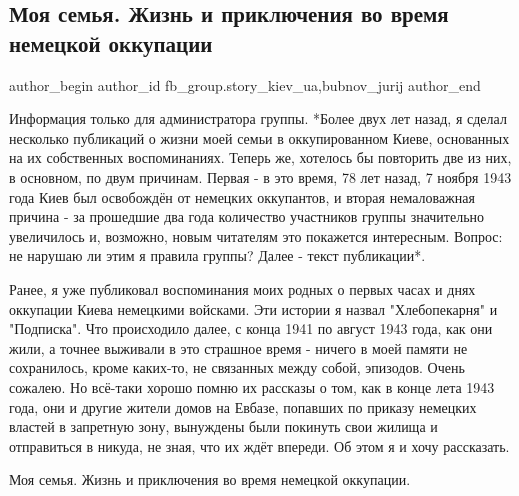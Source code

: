  
 
 
 
 
 
\subsection{Моя семья. Жизнь и приключения во время немецкой оккупации}
\label{sec:04_11_2021.fb.fb_group.story_kiev_ua.1.semja_kiev_okupacia}
 
\ifcmt
 author_begin
   author_id fb_group.story_kiev_ua,bubnov_jurij
 author_end
\fi

Информация только для администратора группы. *Более двух лет назад, я сделал
несколько публикаций о жизни моей семьи в оккупированном Киеве, основанных на
их собственных воспоминаниях. Теперь же, хотелось бы повторить две из них, в
основном, по двум причинам. Первая - в это время, 78 лет назад, 7 ноября 1943
года Киев был освобождён от немецких оккупантов, и вторая немаловажная причина
- за прошедшие два года количество участников группы значительно увеличилось и,
возможно, новым читателям это покажется интересным. Вопрос: не нарушаю ли этим
я правила группы? Далее - текст публикации*.

Ранее, я уже публиковал воспоминания моих родных о первых часах и днях
оккупации Киева немецкими войсками. Эти истории я назвал "Хлебопекарня" и
"Подписка". Что происходило далее, с конца 1941 по август 1943 года, как они
жили, а точнее выживали в это страшное время - ничего в моей памяти не
сохранилось, кроме каких-то, не связанных между собой, эпизодов. Очень сожалею.
Но всё-таки хорошо помню их рассказы о том, как в конце лета 1943 года, они и
другие жители домов на Евбазе, попавших по приказу немецких властей в запретную
зону, вынуждены были покинуть свои жилища и отправиться в никуда, не зная, что
их ждёт впереди. Об этом я и хочу рассказать. 

Моя семья. Жизнь и приключения во время немецкой оккупации. 

